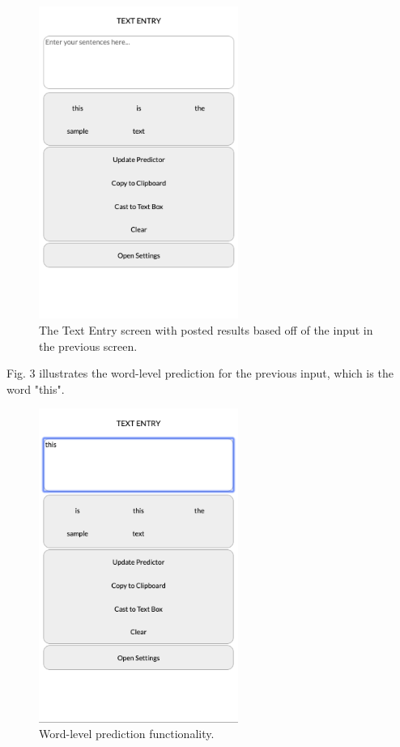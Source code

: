 \documentclass[journal]{./IEEE/IEEEtran}
\begin{document}
\begin{figure}[!ht]
\begin{center}

\includegraphics[width=65mm]{images/initial-text-entry.png}
\caption{The Text Entry screen with posted results based off of the input in the previous screen.}

\end{center}
\end{figure}

Fig. 3 illustrates the word-level prediction for the previous input, which is the word "this".

\begin{figure}[!ht]
\begin{center}

\includegraphics[width=65mm]{images/word-level-prediction.png}
\caption{Word-level prediction functionality.}

\end{center}
\end{figure}
\end{document}
